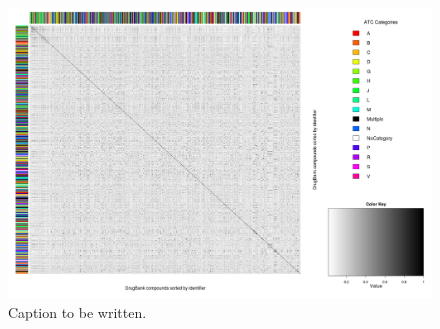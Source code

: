 \documentclass{bioinfo}
\begin{document}
\begin{figure}[!tpb]%
\centerline{\includegraphics{figS5.png}}
\caption{Caption to be written.}\label{fig:S05}
\end{figure}










\end{document}
